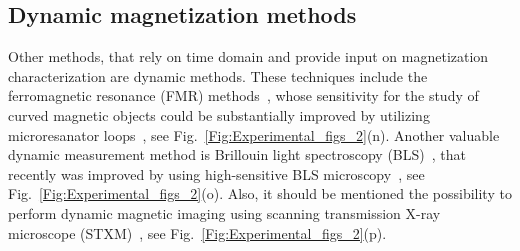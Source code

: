 \subsection{Dynamic magnetization methods}

Other methods, that rely on time domain and provide input on magnetization characterization are dynamic methods. These techniques include the ferromagnetic resonance (FMR) methods~\cite{Liedke13}, whose sensitivity for the study of curved magnetic objects could be substantially improved by utilizing microresanator loops~\cite{Lenz19}, see Fig.~\ref{Fig:Experimental_figs_2}(n). Another valuable dynamic measurement method is Brillouin light spectroscopy (BLS)~\cite{Demokritov01}, that recently was improved by using high-sensitive BLS microscopy~\cite{Vogt12,Vogt14,Schultheiss19}, see Fig.~\ref{Fig:Experimental_figs_2}(o). Also, it should be mentioned the possibility to perform dynamic magnetic imaging using scanning transmission X-ray microscope (STXM)~\cite{Wintz11,Streubel15,Streubel15d,Wintz16,Woo16,Zimmermann18,Sluka19}, see Fig.~\ref{Fig:Experimental_figs_2}(p).







